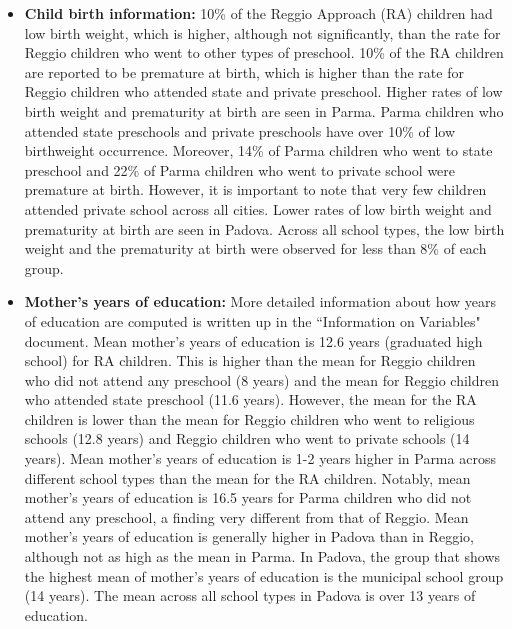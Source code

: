 \documentclass[12pt]{article}
\begin{document}
\begin{itemize}
\item \textbf{Child birth information:} 10\% of the Reggio Approach (RA) children had low birth weight, which is higher, although not significantly, than the rate for Reggio children who went to other types of preschool. 10\% of the RA children are reported to be premature at birth, which is higher than the rate for Reggio children who attended state and private preschool. Higher rates of low birth weight and prematurity at birth are seen in Parma. Parma children who attended state preschools and private preschools have over 10\% of low birthweight occurrence. Moreover, 14\% of Parma children who went to state preschool and 22\% of Parma children who went to private school were premature at birth. However, it is important to note that very few children attended private school across all cities. Lower rates of low birth weight and prematurity at birth are seen in Padova. Across all school types, the low birth weight and the prematurity at birth were observed for less than 8\% of each group. 

\item \textbf{Mother's years of education:} More detailed information about how years of education are computed is written up in the ``Information on Variables" document. Mean mother's years of education is 12.6 years (graduated high school) for RA children. This is higher than the mean for Reggio children who did not attend any preschool (8 years) and the mean for Reggio children who attended state preschool (11.6 years). However, the mean for the RA children is lower than the mean for Reggio children who went to religious schools (12.8 years) and Reggio children who went to private schools (14 years). Mean mother's years of education is 1-2 years higher in Parma across different school types than the mean for the RA children. Notably, mean mother's years of education is 16.5 years for Parma children who did not attend any preschool, a finding very different from that of Reggio. Mean mother's years of education is generally higher in Padova than in Reggio, although not as high as the mean in Parma. In Padova, the group that shows the highest mean of mother's years of education is the municipal school group (14 years). The mean across all school types in Padova is over 13 years of education.


\end{itemize}
\end{document}

